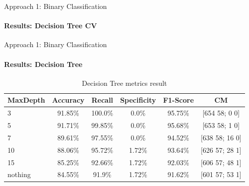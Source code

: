 \documentclass[9pt, pstricks, xcolor=dvipsnames]{beamer}
\begin{document}
\begin{frame}{Approach 1: Binary Classification}
\framesubtitle{Results: Decision Tree CV}
\begin{table}[H]
    \centering
    \caption{Decision Tree metrics result for CrossValidation}
    \label{tab:DT_CV_approach1}
\end{table}
\end{frame}
\begin{frame}{Approach 1: Binary Classification}
\framesubtitle{Results: Decision Tree}
\begin{table}[H]
    \centering
    \begin{tabular}{lccccc}
        \toprule
        MaxDepth & Accuracy & Recall & Specificity & F1-Score & CM \\
        \midrule
        3 & 91.85\%  & 100.0\%  & 0.0\%  & 95.75\% & [654 58; 0 0] \\
        5 & 91.71\%  & 99.85\%  & 0.0\%  & 95.68\% & [653 58; 1 0] \\
        7 & 89.61\%  & 97.55\%  & 0.0\%  & 94.52\% & [638 58; 16 0] \\
        10 & 88.06\%  & 95.72\%  & 1.72\%  & 93.64\% & [626 57; 28 1] \\
        15 & 85.25\%  & 92.66\%  & 1.72\%  & 92.03\% & [606 57; 48 1] \\
        nothing & 84.55\%  & 91.9\%  & 1.72\%  & 91.62\% & [601 57; 53 1] \\
        \bottomrule
    \end{tabular}
    \caption{Decision Tree metrics result}
    \label{tab:dt_approach1}
\end{table}
\end{frame}
\end{document}
